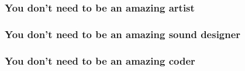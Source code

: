 \documentclass{beamer}
\begin{document}
\begin{frame}
\frametitle{You don't need to be an amazing artist}
\begin{figure}
\end{figure}
\end{frame}

\begin{frame}
\frametitle{You don't need to be an amazing sound designer}
\begin{figure}
\end{figure}
\end{frame}

\begin{frame}
\frametitle{You don't need to be an amazing coder}
\begin{figure}
\end{figure}
\end{frame}
\end{document}
